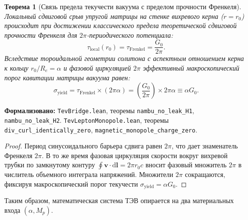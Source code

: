 \documentclass[11pt,a4paper]{article}
\newtheorem{theorem}{Теорема}
\theoremstyle{definition}
\theoremstyle{remark}
\begin{document}
\begin{theorem}[Связь предела текучести вакуума с пределом прочности Френкеля]
\label{thm:frenkel_to_mises_exact}
Локальный сдвиговой срыв упругой матрицы на стенке вихревого керна ($r = r_0$) происходит при достижении классического предела теоретической сдвиговой прочности Френкеля для $2\pi$-периодического потенциала:
\begin{equation}
    \tau_{\mathrm{local}}(r_0) = \tau_{\mathrm{Frenkel}} = \frac{G_0}{2\pi}.
    \label{eq:frenkel_local_limit}
\end{equation}
Вследствие тороидальной геометрии солитона с аспектным отношением керна к кольцу $r_0 / R_e = \alpha$ и фазовой циркуляцией $2\pi$ эффективный макроскопический порог кавитации матрицы вакуума равен:
\begin{equation}
    \sigma_{\mathrm{yield}} = \tau_{\mathrm{Frenkel}} \times (2\pi \alpha) = \left(\frac{G_0}{2\pi}\right) \times 2\pi \alpha \equiv \alpha G_0.
    \label{eq:frenkel_cancellation_exact}
\end{equation}
\end{theorem}

\noindent\small\textbf{Формализовано:} \texttt{TevBridge.lean}, теоремы \texttt{nambu_no_leak_H1}, \texttt{nambu_no_leak_H2}. \texttt{TevLeptonMonopole.lean}, теоремы \texttt{div_curl_identically_zero}, \texttt{magnetic_monopole_charge_zero}.

\begin{proof}
Период синусоидального барьера сдвига равен $2\pi$, что дает знаменатель Френкеля $2\pi$. В то же время фазовая циркуляция скорости вокруг вихревой трубки по замкнутому контуру $\oint \mathbf{v} \cdot \mathrm{d}\mathbf{l} = 2\pi r_0 c$ вносит фазовый множитель $2\pi$ в числитель объемного интеграла напряжений. Множители $2\pi$ сокращаются, фиксируя макроскопический порог текучести $\sigma_{\mathrm{yield}} = \alpha G_0$.
\end{proof}
Таким образом, математическая система ТЭВ опирается на два материальных входа $(\alpha, M_p)$.
\end{document}
